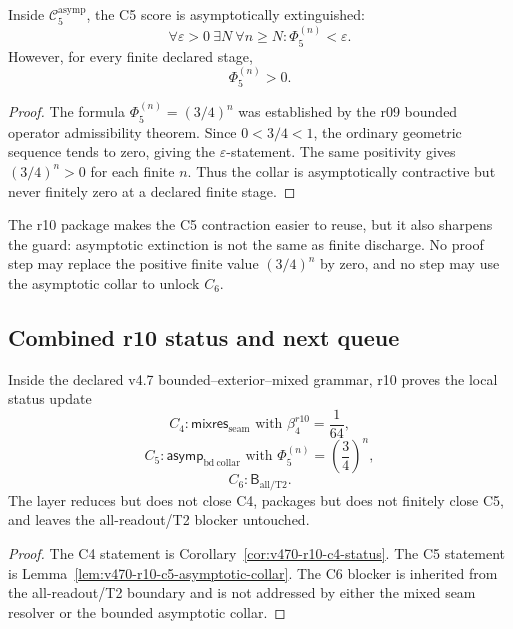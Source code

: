 \begin{lemma}
\label{lem:v470-r10-c5-asymptotic-collar}
Inside \(\mathcal C_5^{\mathrm{asymp}}\), the C5 score is asymptotically
extinguished:
\[
\forall\varepsilon>0\ \exists N\ \forall n\ge N:
\Phi_5^{(n)}<\varepsilon.
\]
However, for every finite declared stage,
\[
\Phi_5^{(n)}>0.
\]
\end{lemma}

\begin{proof}
The formula \(\Phi_5^{(n)}=(3/4)^n\) was established by the r09 bounded operator
admissibility theorem.  Since \(0<3/4<1\), the ordinary geometric sequence tends
to zero, giving the \(\varepsilon\)-statement.  The same positivity gives
\((3/4)^n>0\) for each finite \(n\).  Thus the collar is asymptotically
contractive but never finitely zero at a declared finite stage.
\end{proof}

\begin{remark}
\label{rem:v470-r10-no-finite-closure-from-asymptotic-packaging}
The r10 package makes the C5 contraction easier to reuse, but it also sharpens
the guard: asymptotic extinction is not the same as finite discharge.  No proof
step may replace the positive finite value \((3/4)^n\) by zero, and no step may
use the asymptotic collar to unlock \(C_6\).
\end{remark}

\subsection{Combined r10 status and next queue}
\label{subsec:v470-r10-combined-status}

\begin{theorem}
\label{thm:v470-r10-mixed-seam-asymptotic-collar-theorem}
Inside the declared v4.7 bounded--exterior--mixed grammar, r10 proves the local
status update
\[
C_4:
\mathsf{mixres}_{\mathrm{seam}}
\text{ with }\beta_4^{r10}=\frac1{64},
\]
\[
C_5:
\mathsf{asymp}_{\mathrm{bd\ collar}}
\text{ with }\Phi_5^{(n)}=\left(\frac34\right)^n,
\]
\[
C_6:
\mathsf B_{\mathrm{all/T2}}.
\]
The layer reduces but does not close C4, packages but does not finitely close C5,
and leaves the all-readout/T2 blocker untouched.
\end{theorem}

\begin{proof}
The C4 statement is Corollary~\ref{cor:v470-r10-c4-status}.  The C5 statement is
Lemma~\ref{lem:v470-r10-c5-asymptotic-collar}.  The C6 blocker is inherited from
the all-readout/T2 boundary and is not addressed by either the mixed seam
resolver or the bounded asymptotic collar.
\end{proof}

